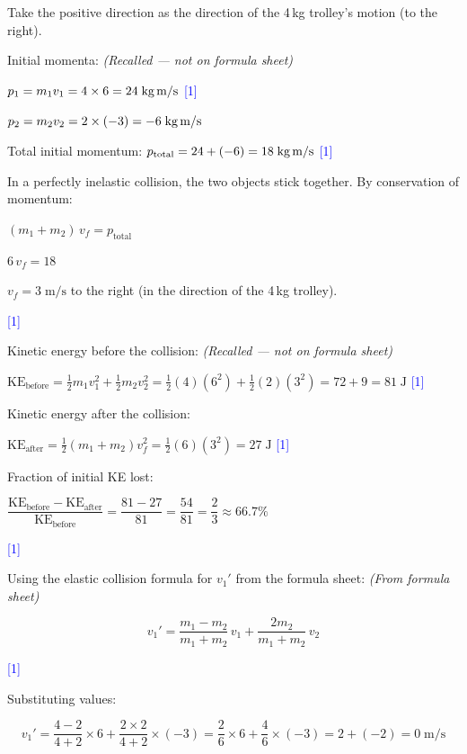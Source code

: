 \documentclass[12pt,a4paper]{article}
\newcommand{\markstep}[1]{\hfill\textcolor{blue}{[#1]}}
\newcommand{\finalanswer}[1]{%
  \begin{tcolorbox}[colback=green!5!white,colframe=green!50!black,boxrule=0.5pt]
  #1
  \end{tcolorbox}
}
\newcommand{\fromsheet}{\textit{(From formula sheet)}}
\newcommand{\recalled}{\textit{(Recalled --- not on formula sheet)}}
\begin{document}
\begin{parts}

\item Take the positive direction as the direction of the 4\,kg trolley's motion (to the right).

Initial momenta: \recalled

$p_1 = m_1 v_1 = 4 \times 6 = 24\;\text{kg\,m/s}$ \markstep{1}

$p_2 = m_2 v_2 = 2 \times (-3) = -6\;\text{kg\,m/s}$

Total initial momentum: $p_{\text{total}} = 24 + (-6) = 18\;\text{kg\,m/s}$ \markstep{1}

In a perfectly inelastic collision, the two objects stick together. By conservation of momentum:

$(m_1 + m_2)\,v_f = p_{\text{total}}$

$6\,v_f = 18$

\finalanswer{$v_f = 3\;\text{m/s}$ to the right (in the direction of the 4\,kg trolley).} \markstep{1}

\item Kinetic energy before the collision: \recalled

$\text{KE}_{\text{before}} = \tfrac{1}{2}m_1 v_1^2 + \tfrac{1}{2}m_2 v_2^2 = \tfrac{1}{2}(4)(6^2) + \tfrac{1}{2}(2)(3^2) = 72 + 9 = 81\;\text{J}$ \markstep{1}

Kinetic energy after the collision:

$\text{KE}_{\text{after}} = \tfrac{1}{2}(m_1+m_2)v_f^2 = \tfrac{1}{2}(6)(3^2) = 27\;\text{J}$ \markstep{1}

Fraction of initial KE lost:

\finalanswer{$\dfrac{\text{KE}_{\text{before}} - \text{KE}_{\text{after}}}{\text{KE}_{\text{before}}} = \dfrac{81 - 27}{81} = \dfrac{54}{81} = \dfrac{2}{3} \approx 66.7\%$} \markstep{1}

\item Using the elastic collision formula for $v_1'$ from the formula sheet: \fromsheet

\[
v_1' = \frac{m_1 - m_2}{m_1 + m_2}\,v_1 + \frac{2m_2}{m_1 + m_2}\,v_2
\]

\markstep{1}

Substituting values:

\[
v_1' = \frac{4 - 2}{4 + 2}\times 6 + \frac{2\times 2}{4 + 2}\times(-3) = \frac{2}{6}\times 6 + \frac{4}{6}\times(-3) = 2 + (-2) = 0\;\text{m/s}
\]


\end{parts}
\end{document}
